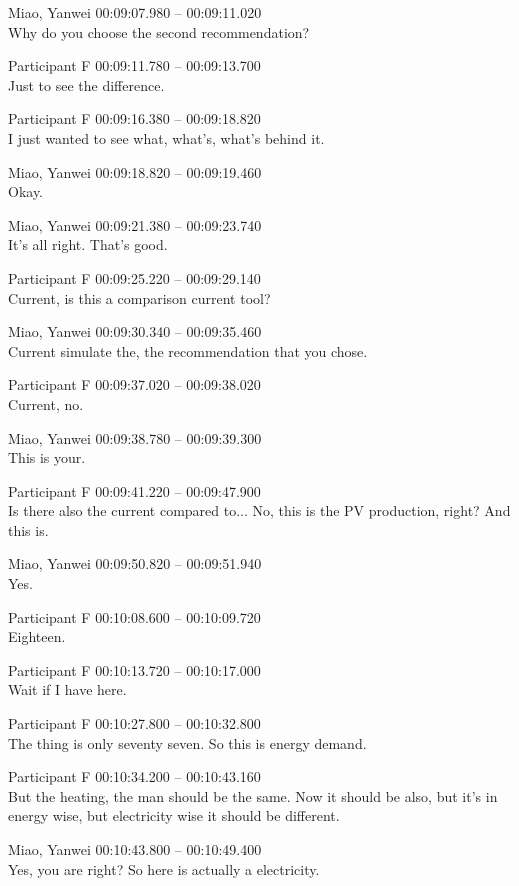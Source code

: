 {Miao, Yanwei 00:09:07.980 -- 00:09:11.020 \\
Why do you choose the second recommendation?

Participant F 00:09:11.780 -- 00:09:13.700 \\
Just to see the difference.

Participant F 00:09:16.380 -- 00:09:18.820 \\
I just wanted to see what, what's, what's behind it.

Miao, Yanwei 00:09:18.820 -- 00:09:19.460 \\
Okay.

Miao, Yanwei 00:09:21.380 -- 00:09:23.740 \\
It's all right. That's good.

Participant F 00:09:25.220 -- 00:09:29.140 \\
Current, is this a comparison current tool?

Miao, Yanwei 00:09:30.340 -- 00:09:35.460 \\
Current simulate the, the recommendation that you chose.

Participant F 00:09:37.020 -- 00:09:38.020 \\
Current, no.

Miao, Yanwei 00:09:38.780 -- 00:09:39.300 \\
This is your.

Participant F 00:09:41.220 -- 00:09:47.900 \\
Is there also the current compared to... No, this is the PV production, right? And this is.

Miao, Yanwei 00:09:50.820 -- 00:09:51.940 \\
Yes.

Participant F 00:10:08.600 -- 00:10:09.720 \\
Eighteen.

Participant F 00:10:13.720 -- 00:10:17.000 \\
Wait if I have here.

Participant F 00:10:27.800 -- 00:10:32.800 \\
The thing is only seventy seven. So this is energy demand.

Participant F 00:10:34.200 -- 00:10:43.160 \\
But the heating, the man should be the same. Now it should be also, but it's in energy wise, but electricity wise it should be different.

Miao, Yanwei 00:10:43.800 -- 00:10:49.400 \\
Yes, you are right? So here is actually a electricity.

}
